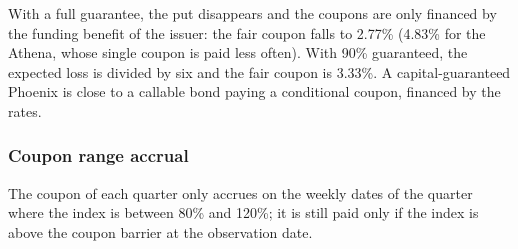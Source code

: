 \documentclass[11pt,a4paper]{article}
\begin{document}
\begin{table}[htbp]
  \centering
  \small
  \caption{Capital guarantee: the redemption at maturity is floored at 90\% or 100\% of the nominal.}
  \label{tab:phoenix-guaranteed}
\end{table}

With a full guarantee, the put disappears and the coupons are only financed by the funding benefit of the issuer:
the fair coupon falls to 2.77\% (4.83\% for the Athena, whose single coupon is paid less often). With 90\% guaranteed,
the expected loss is divided by six and the fair coupon is 3.33\%. A capital-guaranteed Phoenix is close to a
callable bond paying a conditional coupon, financed by the rates.

\clearpage
\subsubsection{Coupon range accrual}

The coupon of each quarter only accrues on the weekly dates of the quarter where the index is between 80\% and 120\%;
it is still paid only if the index is above the coupon barrier at the observation date.
\end{document}
